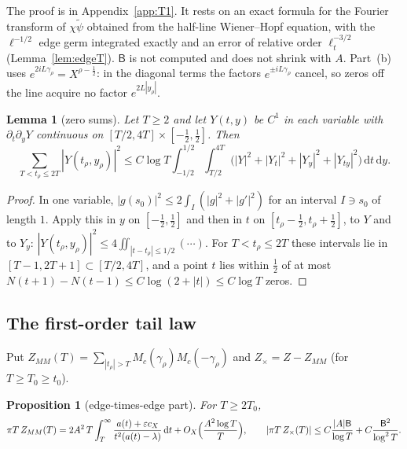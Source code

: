 \documentclass[11pt]{amsart}
\newcommand{\dd}{\,\mathrm{d}}
\newcommand{\eps}{\varepsilon}
\newtheorem{proposition}[theorem]{Proposition}
\newtheorem{lemma}[theorem]{Lemma}
\theoremstyle{definition}
\theoremstyle{remark}
\numberwithin{equation}{section}
\begin{document}
The proof is in Appendix~\ref{app:T1}. It rests on an exact formula for the Fourier transform of $\chi\tilde\psi$ obtained from the half-line Wiener--Hopf equation, with the $\ell^{-1/2}$ edge germ integrated exactly and an error of relative order $\ell_t^{-3/2}$ (Lemma~\ref{lem:edgeT}). $\mathsf B$ is not computed and does not shrink with $A$. Part~(b) uses $e^{2iL\gamma_\rho}=X^{\rho-\frac12}$: in the diagonal terms the factors $e^{\pm iL\gamma_\rho}$ cancel, so zeros off the line acquire no factor $e^{2L|y_\rho|}$.

\begin{lemma}[zero sums]\label{lem:Z}
Let $T\ge2$ and let $Y(t,y)$ be $C^1$ in each variable with $\partial_t\partial_yY$ continuous on $[T/2,4T]\times[-\frac12,\frac12]$. Then
\[
\sum_{T<t_\rho\le2T}|Y(t_\rho,y_\rho)|^2\le C\log T\int_{-1/2}^{1/2}\int_{T/2}^{4T}\bigl(|Y|^2+|Y_t|^2+|Y_y|^2+|Y_{ty}|^2\bigr)\dd t\dd y .
\]
\end{lemma}

\begin{proof}
In one variable, $|g(s_0)|^2\le2\int_I(|g|^2+|g'|^2)$ for an interval $I\ni s_0$ of length $1$. Apply this in $y$ on $[-\frac12,\frac12]$ and then in $t$ on $[t_\rho-\frac12,t_\rho+\frac12]$, to $Y$ and to $Y_y$: $|Y(t_\rho,y_\rho)|^2\le4\iint_{|t-t_\rho|\le1/2}(\cdots)$. For $T<t_\rho\le2T$ these intervals lie in $[T-1,2T+1]\subset[T/2,4T]$, and a point $t$ lies within $\frac12$ of at most $N(t+1)-N(t-1)\le C\log(2+|t|)\le C\log T$ zeros.
\end{proof}

\subsection{The first-order tail law}
Put $Z_{MM}(T)=\sum_{|t_\rho|>T}M_c(\gamma_\rho)M_c(-\gamma_\rho)$ and $Z_\times=Z-Z_{MM}$ (for $T\ge T_0\ge t_0$).

\begin{proposition}[edge-times-edge part]\label{prop:T4}
For $T\ge2T_0$,
\[
\pi T\,Z_{MM}(T)=2A^2\,T\int_T^\infty\frac{a(t)+\eps c_X}{t^2(a(t)-\lambda)}\dd t+O_X\Bigl(\frac{A^2\log T}T\Bigr),\qquad|\pi T\,Z_\times(T)|\le C\frac{|A|\mathsf B}{\log T}+C\frac{\mathsf B^2}{\log^2T}.
\]
\end{proposition}
\end{document}
